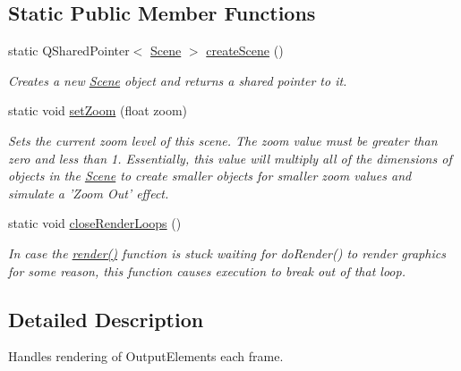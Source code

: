 \subsection*{Static Public Member Functions}
\begin{DoxyCompactItemize}
\item 
static Q\-Shared\-Pointer$<$ \hyperlink{class_picto_1_1_scene}{Scene} $>$ \hyperlink{class_picto_1_1_scene_a26d9a1e0c272cdbaf9d6c61125be1700}{create\-Scene} ()
\begin{DoxyCompactList}\small\item\em Creates a new \hyperlink{class_picto_1_1_scene}{Scene} object and returns a shared pointer to it. \end{DoxyCompactList}\item 
\hypertarget{class_picto_1_1_scene_a5d9afebbcf97818d17f3da512ab94df9}{static void \hyperlink{class_picto_1_1_scene_a5d9afebbcf97818d17f3da512ab94df9}{set\-Zoom} (float zoom)}\label{class_picto_1_1_scene_a5d9afebbcf97818d17f3da512ab94df9}

\begin{DoxyCompactList}\small\item\em Sets the current zoom level of this scene.  The zoom value must be greater than zero and less than 1. Essentially, this value will multiply all of the dimensions of objects in the \hyperlink{class_picto_1_1_scene}{Scene} to create smaller objects for smaller zoom values and simulate a 'Zoom Out' effect. \end{DoxyCompactList}\item 
\hypertarget{class_picto_1_1_scene_ae8009d1b0b96e81c50706fcccbd18b0b}{static void \hyperlink{class_picto_1_1_scene_ae8009d1b0b96e81c50706fcccbd18b0b}{close\-Render\-Loops} ()}\label{class_picto_1_1_scene_ae8009d1b0b96e81c50706fcccbd18b0b}

\begin{DoxyCompactList}\small\item\em In case the \hyperlink{class_picto_1_1_scene_aaf9d9efc4da11b8596628a102b152de9}{render()} function is stuck waiting for do\-Render() to render graphics for some reason, this function causes execution to break out of that loop. \end{DoxyCompactList}\end{DoxyCompactItemize}


\subsection{Detailed Description}
Handles rendering of Output\-Elements each frame. 

